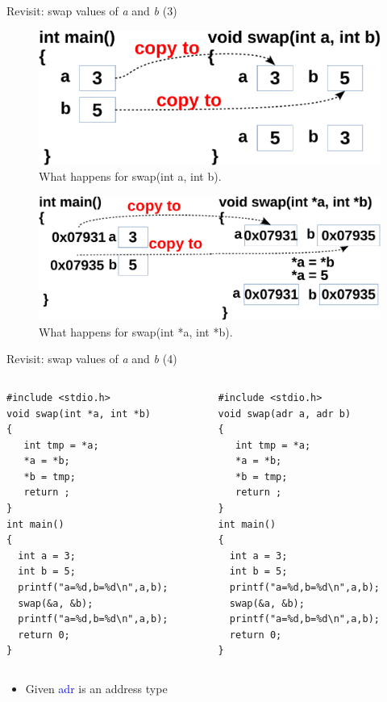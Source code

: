 \begin{frame}[fragile]{Revisit: swap values of \textit{a} and \textit{b} (3)}
\begin{figure}
	\includegraphics[width=0.55\linewidth]{figs/swap1.pdf}
	\caption{What happens for swap(int a, int b).}
\end{figure}

\begin{figure}
	\includegraphics[width=0.62\linewidth]{figs/swap2.pdf}
	\caption{What happens for swap(int *a, int *b).}
\end{figure}
\end{frame}


\begin{frame}[fragile]{Revisit: swap values of \textit{a} and \textit{b} (4)}
\vspace{-0.25in}
\begin{columns}
\begin{column}{0.47\linewidth}
\begin{lstlisting}
#include <stdio.h>
void swap(int *a, int *b)
{
   int tmp = *a;
   *a = *b;
   *b = tmp;
   return ;
}
int main()
{
  int a = 3; 
  int b = 5;
  printf("a=%d,b=%d\n",a,b);
  swap(&a, &b);
  printf("a=%d,b=%d\n",a,b);
  return 0;
}
\end{lstlisting}
\end{column}
\begin{column}{0.47\linewidth}
\begin{lstlisting}[xleftmargin=0.005\linewidth]
#include <stdio.h>
void swap(adr a, adr b)
{
   int tmp = *a;
   *a = *b;
   *b = tmp;
   return ;
}
int main()
{
  int a = 3; 
  int b = 5;
  printf("a=%d,b=%d\n",a,b);
  swap(&a, &b);
  printf("a=%d,b=%d\n",a,b);
  return 0;
}
\end{lstlisting}
\end{column}
\end{columns}
\vspace{-0.1in}
\begin{itemize}
	\item {Given \textcolor{blue}{adr} is an address type}
\end{itemize}
\end{frame}

